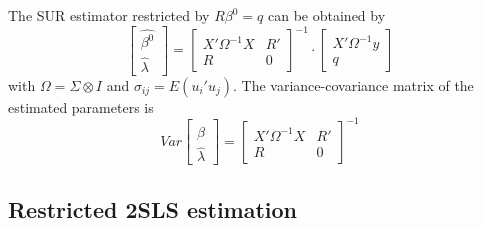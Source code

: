 The SUR estimator restricted by $R \beta^0 = q$ can be obtained by
\begin{equation}
   \left[ \begin{array}{c}
      \widehat{\beta^0} \\ \widehat{\lambda}
   \end{array} \right]
   =
   \left[ \begin{array}{cc}
      X' \Omega^{-1} X & R' \\ 
      R & 0
   \end{array} \right]^{-1}
   \cdot
   \left[ \begin{array}{c}
      X' \Omega^{-1} y \\ q 
   \end{array} \right]
\end{equation}
with $\Omega = \Sigma \otimes I$ and
$\sigma_{ij} = E \left( u_i' u_j \right)$.
The variance-covariance matrix of the estimated parameters is
\begin{equation}
   Var 
   \left[ \begin{array}{c}
      \widehat{\beta} \\ \widehat{\lambda}
   \end{array} \right] 
   = 
   \left[ \begin{array}{cc}
      X' \Omega^{-1} X & R' \\ 
      R & 0
   \end{array} \right]^{-1}
\end{equation}

\subsection{Restricted 2SLS estimation}

